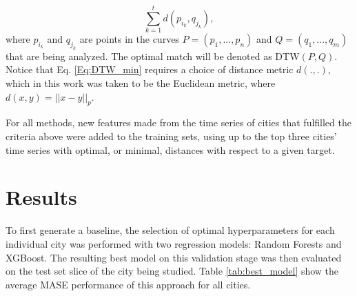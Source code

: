 	\begin{equation}
		\label{Eq:DTW_min}
		\sum_{k=1}^{t} d \left( p_{i_k} , q_{j_k} \right) ,
	\end{equation}
\noindent
where $p_{i_k}$ and $q_{j_k}$ are points in the curves $P = (p_1, ..., p_n) $ and $Q = (q_1, ..., q_m)$ that are being analyzed. The optimal match will be denoted as DTW$(P,Q)$.
Notice that Eq. \ref{Eq:DTW_min} requires a choice of distance metric $d(.,.)$, which in this work was taken to be the Euclidean metric, where $d(x,y) = || x-y ||_p$.

For all methods, new features made from the time series of cities that fulfilled the criteria above were added to the training sets, using up to the top three cities' time series with optimal, or minimal, distances with respect to a given target. 



\section{Results}


To first generate a baseline, the selection of optimal hyperparameters for each individual city was performed with two regression models: Random Forests and XGBoost. The resulting best model on this validation stage was then evaluated on the test set slice of the city being studied. Table \ref{tab:best_model} show the average MASE performance of this approach for all cities.

